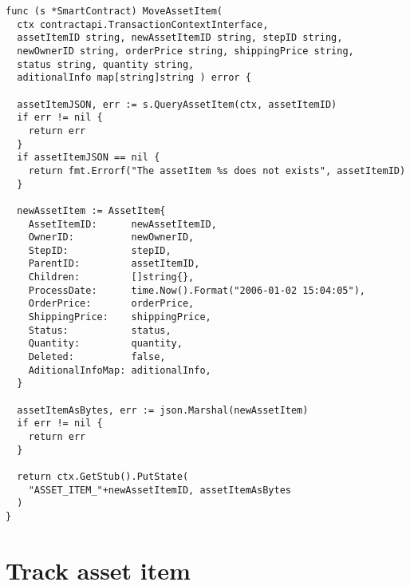 \begin{verbatim}
func (s *SmartContract) MoveAssetItem(
  ctx contractapi.TransactionContextInterface, 
  assetItemID string, newAssetItemID string, stepID string, 
  newOwnerID string, orderPrice string, shippingPrice string, 
  status string, quantity string, 
  aditionalInfo map[string]string ) error {
  
  assetItemJSON, err := s.QueryAssetItem(ctx, assetItemID)
  if err != nil {
    return err
  }
  if assetItemJSON == nil {
    return fmt.Errorf("The assetItem %s does not exists", assetItemID)
  }

  newAssetItem := AssetItem{
    AssetItemID:      newAssetItemID,
    OwnerID:          newOwnerID,
    StepID:           stepID,
    ParentID:         assetItemID,
    Children:         []string{},
    ProcessDate:      time.Now().Format("2006-01-02 15:04:05"),
    OrderPrice:       orderPrice,
    ShippingPrice:    shippingPrice,
    Status:           status,
    Quantity:         quantity,
    Deleted:          false,
    AditionalInfoMap: aditionalInfo,
  }

  assetItemAsBytes, err := json.Marshal(newAssetItem)
  if err != nil {
    return err
  }

  return ctx.GetStub().PutState(
    "ASSET_ITEM_"+newAssetItemID, assetItemAsBytes
  )
}
\end{verbatim}

\section{Track asset item}{} %
\label{app:TrackAssetItem}


